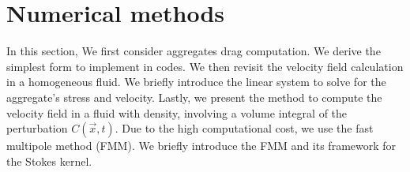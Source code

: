 \section{Numerical methods}
In this section, 
We first consider aggregates drag computation. We derive the simplest form to implement in codes. We then revisit the velocity field calculation in a homogeneous fluid. We briefly introduce the linear system to solve for the aggregate's stress and velocity. Lastly, we present the method to compute the velocity field in a fluid with density, involving a volume integral of the perturbation $C(\vec{x},t)$. Due to the high computational cost, we use the fast multipole method (FMM). We briefly introduce the FMM and its framework for the Stokes kernel.

